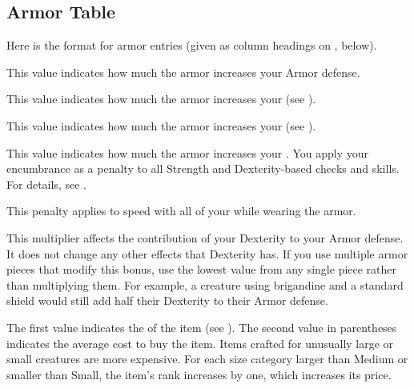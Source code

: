  \subsection{Armor Table}
    \par Here is the format for armor entries (given as column headings on , below).

     This value indicates how much the armor increases your Armor defense.

     This value indicates how much the armor increases your  (see ).

     This value indicates how much the armor increases your  (see ).

     This value indicates how much the armor increases your .
    You apply your encumbrance as a penalty to all Strength and Dexterity-based checks and skills.
    For details, see .

     This penalty applies to speed with all of your  while wearing the armor.

     This multiplier affects the contribution of your Dexterity to your Armor defense.
    It does not change any other effects that Dexterity has.
    If you use multiple armor pieces that modify this bonus, use the lowest value from any single piece rather than multiplying them.
    For example, a creature using brigandine and a standard shield would still add half their Dexterity to their Armor defense.

     The first value indicates the  of the item (see ).
    The second value in parentheses indicates the average cost to buy the item.
    Items crafted for unusually large or small creatures are more expensive.
    For each size category larger than Medium or smaller than Small, the item's rank increases by one, which increases its price.

